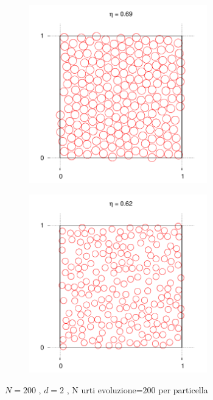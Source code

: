 \documentclass[11pt]{article}
\theoremstyle{plain}
\theoremstyle{remark}
\begin{document}
\begin{figure}[htbp]
        \begin{subfigure}[b]{0.5\textwidth}
                \centering
                \includegraphics[width=0.85\textwidth]{Immagini/Rigide/SnapMeta_2D}
        \end{subfigure}
                \begin{subfigure}[b]{0.5\textwidth}
                \centering
                \includegraphics[width=0.85\textwidth]{Immagini/Rigide/SnapLiquido_2D}
        \end{subfigure}
		
		 \centering  \footnotesize{$N= 200$ , $d=2$ , N urti evoluzione=$ 200 $ per particella}
		\label{fig: snap2d}
\end{figure}
\end{document}
